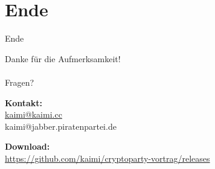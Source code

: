 \section*{Ende}

\begin{frame}{Ende}
  \begin{centering}
    Danke für die Aufmerksamkeit!\\\mbox{}\\
    Fragen?\\

    \vspace{1cm}

    \textbf{Kontakt:}\\
    \href{mailto:kaimi@kaimi.cc}{kaimi@kaimi.cc}\\
    kaimi@jabber.piratenpartei.de\\

    \vspace{0.5cm}

    \textbf{Download:}\\
    {\footnotesize \url{https://github.com/kaimi/cryptoparty-vortrag/releases}}\\
  \end{centering}

\end{frame}
